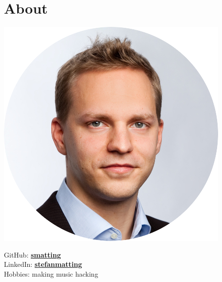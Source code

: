 \documentclass[]{deedy-resume-openfont}
\begin{document}
%
%
\lastupdated

%
%

%
%

\begin{minipage}[t]{0.33\textwidth} 



\section{About} 

\begin{center}
\includegraphics[scale=0.3]{mug-round.png}
\end{center}

GitHub: \href{https://github.com/smatting}{\bf smatting} \\
LinkedIn:  \href{https://www.linkedin.com/in/stefanmatting/}{\bf stefanmatting} \\
Hobbies: making music \textbullet{} hacking


\end{minipage}
\end{document}

